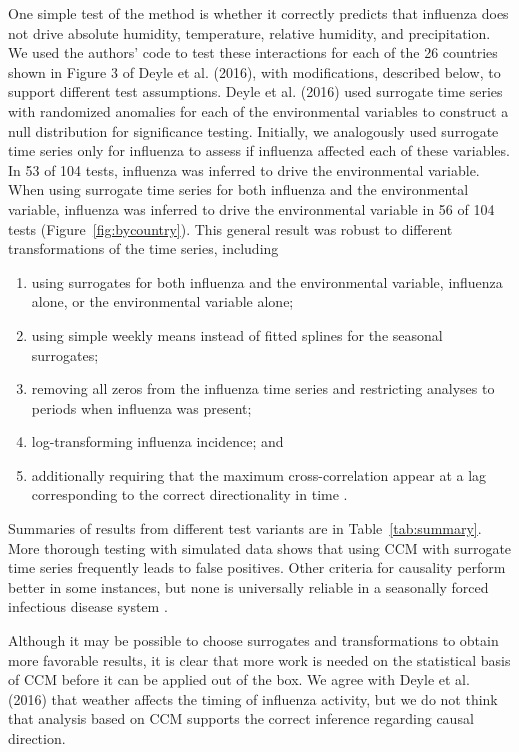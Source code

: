 \documentclass[11pt]{article}
\begin{document}
One simple test of the method is whether it correctly predicts that influenza does not drive absolute humidity, temperature, relative humidity, and precipitation.
We used the authors' code to test these interactions for each of the 26 countries shown in Figure 3 of Deyle et al. (2016), with modifications, described below, to support different test assumptions.
Deyle et al. (2016) used surrogate time series with randomized anomalies for each of the environmental variables to construct a null distribution for significance testing.
Initially, we analogously used surrogate time series only for influenza to assess if influenza affected each of these variables.
In 53 of 104 tests, influenza was inferred to drive the environmental variable.
When using surrogate time series for both influenza and the environmental variable, influenza was inferred to drive the environmental variable in 56 of 104 tests (Figure~\ref{fig:bycountry}).
This general result was robust to different transformations of the time series, including
\begin{enumerate}
\item using surrogates for both influenza and the environmental variable, influenza alone, or the environmental variable alone;
\item using simple weekly means instead of fitted splines for the seasonal surrogates;
\item removing all zeros from the influenza time series and restricting analyses to periods when influenza was present;
\item log-transforming influenza incidence; and
\item additionally requiring that the maximum cross-correlation appear at a lag corresponding to the correct directionality in time \cite{Ye2015}.
\end{enumerate}
Summaries of results from different test variants are in Table~\ref{tab:summary}.
More thorough testing with simulated data shows that using CCM with surrogate time series frequently leads to false positives.
Other criteria for causality perform better in some instances, but none is universally reliable in a seasonally forced infectious disease system \cite{Cobey2016}.

Although it may be possible to choose surrogates and transformations to obtain more favorable results, it is clear that more work is needed on the statistical basis of CCM before it can be applied out of the box.
We agree with Deyle et al. (2016) that weather affects the timing of influenza activity, but we do not think that analysis based on CCM supports the correct inference regarding causal direction.
\end{document}
